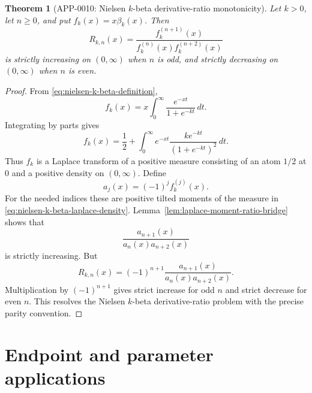 \documentclass[11pt]{article}
\numberwithin{equation}{section}
\newtheorem{theorem}{Theorem}[section]
\theoremstyle{definition}
\theoremstyle{remark}
\newcommand{\1}{\mathbf 1}
\begin{document}
\begin{theorem}[APP-0010: Nielsen \(k\)-beta derivative-ratio monotonicity]
\label{thm:nielsen-k-beta-derivative-ratio}
Let \(k>0\), let \(n\ge0\), and put \(f_k(x)=x\beta_k(x)\).  Then
\begin{equation}
\label{eq:nielsen-k-beta-ratio}
R_{k,n}(x)=
\frac{f_k^{(n+1)}(x)}
{f_k^{(n)}(x)f_k^{(n+2)}(x)}
\end{equation}
is strictly increasing on \((0,\infty)\) when \(n\) is odd, and strictly decreasing on \((0,\infty)\) when \(n\) is even.
\end{theorem}

\begin{proof}
From \eqref{eq:nielsen-k-beta-definition},
\begin{equation}
\label{eq:nielsen-k-beta-x-integral}
f_k(x)=x\int_0^\infty \frac{e^{-xt}}{1+e^{-kt}}\,dt.
\end{equation}
Integrating by parts gives
\begin{equation}
\label{eq:nielsen-k-beta-laplace-density}
f_k(x)
=\frac12+
\int_0^\infty e^{-xt}
\frac{k e^{-kt}}{(1+e^{-kt})^2}\,dt.
\end{equation}
Thus \(f_k\) is a Laplace transform of a positive measure consisting of an atom \(1/2\) at \(0\) and a positive density on \((0,\infty)\).  Define
\begin{equation}
\label{eq:nielsen-k-beta-aj}
a_j(x)=(-1)^j f_k^{(j)}(x).
\end{equation}
For the needed indices these are positive tilted moments of the measure in \eqref{eq:nielsen-k-beta-laplace-density}.  Lemma~\ref{lem:laplace-moment-ratio-bridge} shows that
\begin{equation}
\label{eq:nielsen-k-beta-Bn-increasing}
\frac{a_{n+1}(x)}{a_n(x)a_{n+2}(x)}
\end{equation}
is strictly increasing.  But
\begin{equation}
\label{eq:nielsen-k-beta-sign}
R_{k,n}(x)=(-1)^{n+1}
\frac{a_{n+1}(x)}{a_n(x)a_{n+2}(x)}.
\end{equation}
Multiplication by \((-1)^{n+1}\) gives strict increase for odd \(n\) and strict decrease for even \(n\).  This resolves the Nielsen \(k\)-beta derivative-ratio problem with the precise parity convention.
\end{proof}

\section{Endpoint and parameter applications}
\label{sec:endpoint-parameter-applications}
\end{document}
